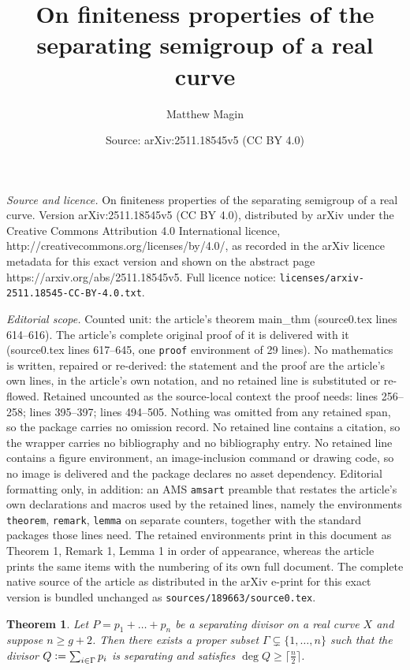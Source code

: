 \documentclass[10pt,a4paper]{amsart}
\title{On finiteness properties of the separating semigroup of a real curve}
\author{Matthew Magin}
\date{Source: arXiv:2511.18545v5 (CC BY 4.0)}
\newtheorem{theorem}{Theorem}
\newcommand{\eqdef}{\vcentcolon=}
\begin{document}
\maketitle

\noindent\emph{Source and licence.} On finiteness properties of the separating semigroup of a real curve. Version arXiv:2511.18545v5 (CC BY 4.0), distributed by arXiv under the Creative Commons Attribution 4.0 International licence, http://creativecommons.org/licenses/by/4.0/, as recorded in the arXiv licence metadata for this exact version and shown on the abstract page https://arxiv.org/abs/2511.18545v5. Full licence notice: \texttt{licenses/arxiv-2511.18545-CC-BY-4.0.txt}.\par\smallskip

\noindent\textit{Editorial scope.} Counted unit: the article's theorem main\_thm (source0.tex lines 614--616). The article's complete original proof of it is delivered with it (source0.tex lines 617--645, one \texttt{proof} environment of 29 lines). No mathematics is written, repaired or re-derived: the statement and the proof are the article's own lines, in the article's own notation, and no retained line is substituted or re-flowed.  Retained uncounted as the source-local context the proof needs: lines 256--258; lines 395--397; lines 494--505.  Nothing was omitted from any retained span, so the package carries no omission record.  No retained line contains a citation, so the wrapper carries no bibliography and no bibliography entry.  No retained line contains a figure environment, an image-inclusion command or drawing code, so no image is delivered and the package declares no asset dependency.  Editorial formatting only, in addition: an AMS \texttt{amsart} preamble that restates the article's own declarations and macros used by the retained lines, namely the environments \texttt{theorem}, \texttt{remark}, \texttt{lemma} on separate counters, together with the standard packages those lines need.  The retained environments print in this document as Theorem 1, Remark 1, Lemma 1 in order of appearance, whereas the article prints the same items with the numbering of its own full document.  The complete native source of the article as distributed in the arXiv e-print for this exact version is bundled unchanged as \texttt{sources/189663/source0.tex}.
  \begin{theorem}\label{deleting_points}
      Let $P = p_1 + \ldots + p_n$ be a separating divisor on a real curve $X$ and suppose $n \geqslant g+2$. Then there exists a proper subset  $\Gamma \subsetneq \{ 1, \ldots, n\}$ such that the divisor $Q \eqdef \sum_{i \in \Gamma} p_i$ is separating and satisfies $\deg{Q} \geqslant \lceil \frac{n}{2} \rceil$. 
  \end{theorem}
\end{document}
